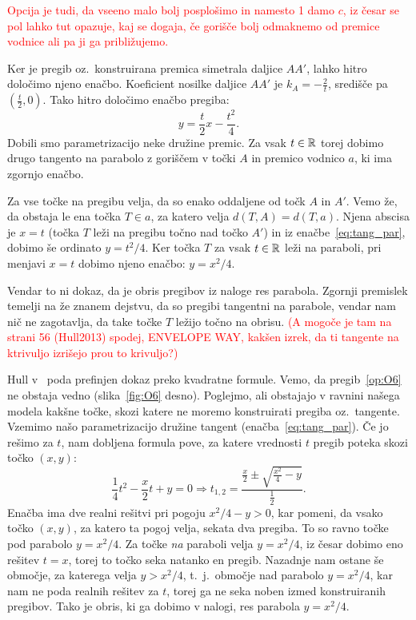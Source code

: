 \textcolor{red}{Opcija je tudi, da vseeno malo bolj posplošimo in namesto 1 damo $c$, iz česar se pol lahko tut opazuje, kaj se dogaja, če gorišče bolj odmaknemo od premice vodnice ali pa ji ga približujemo.}

Ker je pregib oz.\ konstruirana premica simetrala daljice $AA'$, lahko hitro določimo njeno enačbo. Koeficient nosilke daljice $AA'$ je $k_A = -\frac{2}{t}$, središče pa $(\frac{t}{2}, 0)$. Tako hitro določimo enačbo pregiba:
\begin{equation}
    y = \frac{t}{2} x - \frac{t^2}{4}.
    \label{eq:tang_par}
\end{equation}
Dobili smo parametrizacijo neke družine premic. Za vsak $t \in \mathbb R$ torej dobimo drugo tangento na parabolo z goriščem v točki $A$ in premico vodnico $a$, ki ima zgornjo enačbo.

Za vse točke na pregibu velja, da so enako oddaljene od točk $A$ in $A'$. Vemo že, da obstaja le ena točka $T \in a$, za katero velja $d(T, A) = d(T, a)$. Njena abscisa je $x = t$ (točka $T$ leži na pregibu točno nad točko $A'$) in iz enačbe~\ref{eq:tang_par}, dobimo še ordinato $y = t^2 / 4$. Ker točka $T$ za vsak $t \in \mathbb R$ leži na paraboli, pri menjavi $x = t$ dobimo njeno enačbo: $y = x^2 / 4$.

Vendar to ni dokaz, da je obris pregibov iz naloge res parabola. Zgornji premislek temelji na že znanem dejstvu, da so pregibi tangentni na parabole, vendar nam nič ne zagotavlja, da take točke $T$ ležijo točno na obrisu. \textcolor{red}{(A mogoče je tam na strani 56 (Hull2013) spodej, ENVELOPE WAY, kakšen izrek, da ti tangente na ktrivuljo izrišejo prou to krivuljo?)}

Hull v~\cite[str.\ 55--56]{hull2013} poda prefinjen dokaz preko kvadratne formule. Vemo, da pregib~\ref{op:O6} ne obstaja vedno (slika~\ref{fig:O6} desno). Poglejmo, ali obstajajo v ravnini našega modela kakšne točke, skozi katere ne moremo konstruirati pregiba oz.\ tangente. Vzemimo našo parametrizacijo družine tangent (enačba~\ref{eq:tang_par}). Če jo rešimo za $t$, nam dobljena formula pove, za katere vrednosti $t$ pregib poteka skozi točko $(x, y)$:
$$ \frac{1}{4}t^2 - \frac{x}{2}t + y = 0 \Rightarrow t_{1,2} = \frac{\frac{x}{2} \pm \sqrt{\frac{x^2}{4} - y}}{\frac{1}{2}}.$$
Enačba ima dve realni rešitvi pri pogoju $x^2 / 4 - y > 0$, kar pomeni, da vsako točko $(x, y)$, za katero ta pogoj velja, sekata dva pregiba. To so ravno točke pod parabolo $y = x^2 / 4$. Za točke \emph{na} paraboli velja $y = x^2 / 4$, iz česar dobimo eno rešitev $t = x$, torej to točko seka natanko en pregib. Nazadnje nam ostane še območje, za katerega velja $y > x^2 / 4$, t.\ j.\ območje nad parabolo $y = x^2 / 4$, kar nam ne poda realnih rešitev za $t$, torej ga ne seka noben izmed konstruiranih pregibov. Tako je obris, ki ga dobimo v nalogi, res parabola $y = x^2 / 4$.

